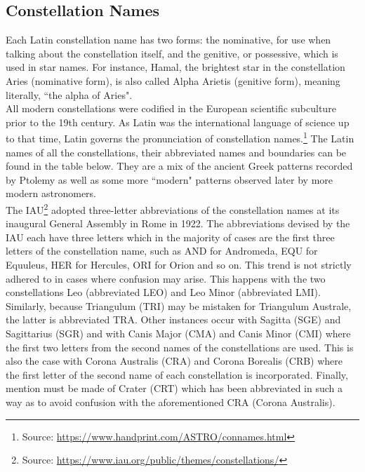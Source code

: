 \documentclass[a4paper,12pt]{extarticle}
\begin{document}
\subsection{Constellation Names}

Each Latin constellation name has two forms: the nominative, for use when talking about the constellation itself, and the genitive, or possessive, which is used in star names. For instance, Hamal, the brightest star in the constellation Aries (nominative form), is also called Alpha Arietis (genitive form), meaning literally, ``the alpha of Aries".\\

All modern constellations were codified in the European scientific subculture prior to the 19th century. As Latin was the international language of science up to that time, Latin governs the pronunciation of constellation names.\footnote{Source: \url{https://www.handprint.com/ASTRO/connames.html}} The Latin names of all the constellations, their abbreviated names and boundaries can be found in the table below. They are a mix of the ancient Greek patterns recorded by Ptolemy as well as some more ``modern" patterns observed later by more modern astronomers.\\

The IAU\footnote{Source: \url{https://www.iau.org/public/themes/constellations/}} adopted three-letter abbreviations of the constellation names at its inaugural General Assembly in Rome in 1922. The abbreviations devised by the IAU each have three letters which in the majority of cases are the first three letters of the constellation name, such as AND for Andromeda, EQU for Equuleus, HER for Hercules, ORI for Orion and so on. This trend is not strictly adhered to in cases where confusion may arise. This happens with the two constellations Leo (abbreviated LEO) and Leo Minor (abbreviated LMI). Similarly, because Triangulum (TRI) may be mistaken for Triangulum Australe, the latter is abbreviated TRA. Other instances occur with Sagitta (SGE) and Sagittarius (SGR) and with Canis Major (CMA) and Canis Minor (CMI) where the first two letters from the second names of the constellations are used. This is also the case with Corona Australis (CRA) and Corona Borealis (CRB) where the first letter of the second name of each constellation is incorporated. Finally, mention must be made of Crater (CRT) which has been abbreviated in such a way as to avoid confusion with the aforementioned CRA (Corona Australis).\\
\end{document}
